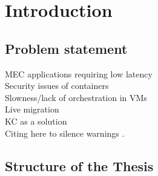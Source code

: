 \chapter{Introduction}
\label{chapter:intro}

\section{Problem statement}
\label{section:problem} 

MEC applications requiring low latency \\
Security issues of containers \\
Slowness/lack of orchestration in VMs \\
Live migration \\
KC as a solution \\

Citing here to silence warnings \cite{9198653}.


\section{Structure of the Thesis}
\label{section:structure} 



